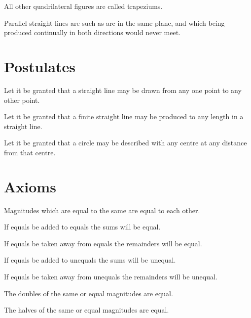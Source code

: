 \documentclass{byrne-book}
\begin{document}
\startdefinition{}\label{def:I.XXXIV}
\begin{center}
All other quadrilateral figures are called trapeziums.
\end{center}


\startdefinition{}\label{def:I.XXXV}
\begin{center}
\drawCurrentPictureInMargin[inside] Parallel straight lines are such as are in the same plane, and which being produced continually in both directions would never meet.
\end{center}

\chapter*{Postulates}

\startpostulate{}\label{post:I.I}
Let it be granted that a straight line may be drawn from any one point to any other point.

\startpostulate{}\label{post:I.II}
Let it be granted that a finite straight line may be produced to any length in a straight line.

\startpostulate{}\label{post:I.III}
Let it be granted that a circle may be described with any centre at any distance from that centre.

\chapter*{Axioms}

\startaxiom{}\label{ax:I.I}
Magnitudes which are equal to the same are equal to each other.


\startaxiom{}\label{ax:I.II}
If equals be added to equals the sums will be equal.


\startaxiom{}\label{ax:I.III}
If equals be taken away from equals the remainders will be equal.


\startaxiom{}\label{ax:I.IV}
If equals be added to unequals the sums will be unequal.


\startaxiom{}\label{ax:I.V}
If equals be taken away from unequals the remainders will be unequal.


\startaxiom{}\label{ax:I.VI}
The doubles of the same or equal magnitudes are equal.


\startaxiom{}\label{ax:I.VII}
The halves of the same or equal magnitudes are equal.
\end{document}
